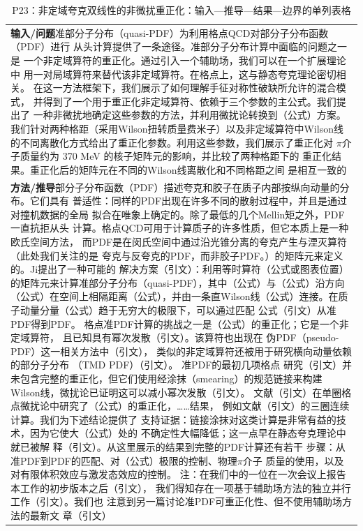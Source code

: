 \documentclass[UTF8,11pt,oneside]{ctexbook}
\begin{document}
\begin{table}[htbp]
  \centering
  \caption*{P23：非定域夸克双线性的非微扰重正化：输入—推导—结果—边界的单列表格}
  \small
  \begin{tabular}{@{}p{}@{}}
    \toprule
    \textbf{输入/问题}\quad 准部分子分布（quasi-PDF）为利用格点QCD对部分子分布函数（PDF）进行 从头计算提供了一条途径。准部分子分布计算中面临的问题之一是 一个非定域算符的重正化。通过引入一个辅助场，我们可以在一个扩展理论中 用一对局域算符来替代该非定域算符。在格点上，这与静态夸克理论密切相关。 在这一方法框架下，我们展示了如何理解手征对称性破缺所允许的混合模式， 并得到了一个用于重正化非定域算符、依赖于三个参数的主公式。我们提出了 一种非微扰地确定这些参数的方法，并利用微扰论转换到（公式）方案。 我们针对两种格距（采用Wilson扭转质量费米子）以及非定域算符中Wilson线 的不同离散化方式给出了重正化参数。利用这些参数，我们展示了重正化对 $\pi$介子质量约为 370 MeV 的核子矩阵元的影响，并比较了两种格距下的 重正化结果。重正化后的矩阵元在不同的Wilson线离散化和不同格距之间 是相互一致的 \\
    \textbf{方法/推导}\quad 部分子分布函数（PDF）描述夸克和胶子在质子内部按纵向动量的分布。它们具有 普适性：同样的PDF出现在许多不同的散射过程中，并且是通过对撞机数据的全局 拟合在唯象上确定的。除了最低的几个Mellin矩之外，PDF一直抗拒从头 计算。格点QCD可用于计算质子的许多性质，但它本质上是一种欧氏空间方法， 而PDF是在闵氏空间中通过沿光锥分离的夸克产生与湮灭算符（此处我们关注的是 夸克与反夸克的PDF，而非胶子PDF。）的矩阵元来定义的。Ji提出了一种可能的 解决方案（引文）：利用等时算符（公式或图表位置）的矩阵元来计算准部分子分布（quasi-PDF），其中（公式）与（公式）沿方向（公式）在空间上相隔距离（公式），并由一条直Wilson线（公式）连接。在质子动量分量（公式）趋于无穷大的极限下，可以通过匹配 公式（引文）从准PDF得到PDF。 格点准PDF计算的挑战之一是（公式）的重正化；它是一个非定域算符， 且已知具有幂次发散（引文）。该算符也出现在 伪PDF（pseudo-PDF）这一相关方法中（引文）， 类似的非定域算符还被用于研究横向动量依赖的部分子分布 （TMD PDF）（引文）。 准PDF的最初几项格点 研究（引文）并未包含完整的重正化，但它们使用经涂抹（smearing）的规范链接来构建 Wilson线，微扰论已证明这可以减小幂次发散（引文）。 文献（引文）在单圈格点微扰论中研究了（公式）的重正化，……结果， 例如文献（引文）的三圈连续计算。我们为下述结论提供了 支持证据：链接涂抹对这类计算是非常有益的技术，因为它使大（公式）处的 不确定性大幅降低；这一点早在静态夸克理论中就已被解 释（引文）。从这里展示的结果到完整的PDF计算还有若干 步骤：从准PDF到PDF的匹配、对（公式）极限的控制、物理$\pi$介子 质量的使用，以及对有限体积效应与激发态效应的控制。 注：在我们中的一位在一次会议上报告本工作的初步版本之后（引文）， 我们得知存在一项基于辅助场方法的独立并行工作（引文）。我们也 注意到另一篇讨论准PDF可重正化性、但不使用辅助场方法的最新文 章（引文） \\

\end{tabular}
\end{table}
\end{document}
